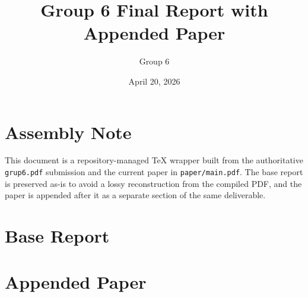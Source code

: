 \documentclass[11pt]{report}
\title{Group 6 Final Report with Appended Paper}
\author{Group 6}
\date{April 20, 2026}
\begin{document}
\maketitle
\clearpage
{}

\chapter*{Assembly Note}
This document is a repository-managed TeX wrapper built from the authoritative
\texttt{grup6.pdf} submission and the current paper in \texttt{paper/main.pdf}.
The base report is preserved as-is to avoid a lossy reconstruction from the
compiled PDF, and the paper is appended after it as a separate section of the
same deliverable.

\tableofcontents
\clearpage
{}

\chapter*{Base Report}
{\hypersetup{pageanchor=false}

}

\appendix

\chapter*{Appended Paper}
{\hypersetup{pageanchor=false}

}
\end{document}
